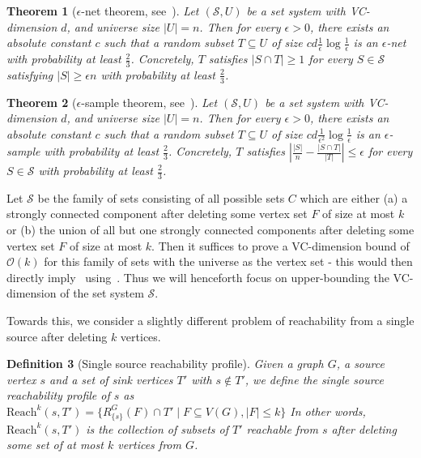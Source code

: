 \documentclass[11pt]{article}
\newtheorem{theorem}{Theorem}[section]
\newtheorem{definition}[theorem]{Definition}
\newcommand{\Reach}{\mathrm{Reach}\xspace}
\renewcommand{\SS}{\mathcal{S}}
\newcommand{\OO}{\mathcal{O}}
\begin{document}
\begin{theorem}[$\epsilon$-net theorem, see~\cite{fm06}]\label{thm:eps_net}
Let $(\SS, U)$ be a set system with VC-dimension $d$, and universe size $|U| = n$. Then for every $\epsilon > 0$, there exists an absolute constant $c$ such that a random subset $T \subseteq U$ of size $c{d}\frac{1}{\epsilon} \log \frac{1}{\epsilon}$ is  an $\epsilon$-net with probability at least $\frac{2}{3}$.
Concretely, $T$ satisfies $|S \cap T| \geq 1$ for every $S \in \SS$ satisfying $|S| \geq \epsilon n$ with probability at least $\frac{2}{3}$.
\end{theorem}

\begin{theorem}[$\epsilon$-sample theorem, see~\cite{fm06}]\label{thm:eps_sample}
Let $(\SS, U)$ be a set system with VC-dimension $d$, and universe size $|U| = n$. Then for every $\epsilon > 0$, there exists an absolute constant $c$ such that a random subset $T \subseteq U$ of size ${cd}\frac{1}{\epsilon^2} \log \frac{1}{\epsilon}$ is an $\epsilon$-sample with probability at least $\frac{2}{3}$. Concretely, $T$ satisfies $\left|\frac{|S|}{n} - \frac{|S \cap T|}{|T|}\right| \leq \epsilon$ for every $S \in \SS$ with probability at least $\frac{2}{3}$.
\end{theorem}










Let $\SS$ be the family of sets consisting of all possible sets $C$ which are either (a) a strongly connected component after deleting some vertex set $F$ of size at most $k$ or (b) the union of all but one strongly connected components after deleting some vertex set $F$ of size at most $k$. Then it suffices to prove a VC-dimension bound of $\OO(k)$ for this family of sets with the universe as the vertex set - this would then directly imply~ using~.
Thus we will henceforth focus on upper-bounding the VC-dimension of the set system $\SS$.


Towards this, we consider a slightly different problem of reachability from a single source after deleting $k$ vertices.

\begin{definition}[Single source reachability profile]
Given a graph $G$, a source vertex $s$ and a set of sink vertices $T'$ with $s \notin T'$, we define the single source reachability profile of $s$ as $\Reach^k(s,T') = \{ R^G_{ \{ s \} } (F) \cap T' \mid F \subseteq V(G), |F| \leq k \}$ 
In other words, $\Reach^k(s,T')$ is the collection of subsets of $T'$ reachable from $s$ after deleting some set of at most $k$ vertices from $G$.

\end{definition}
\end{document}
